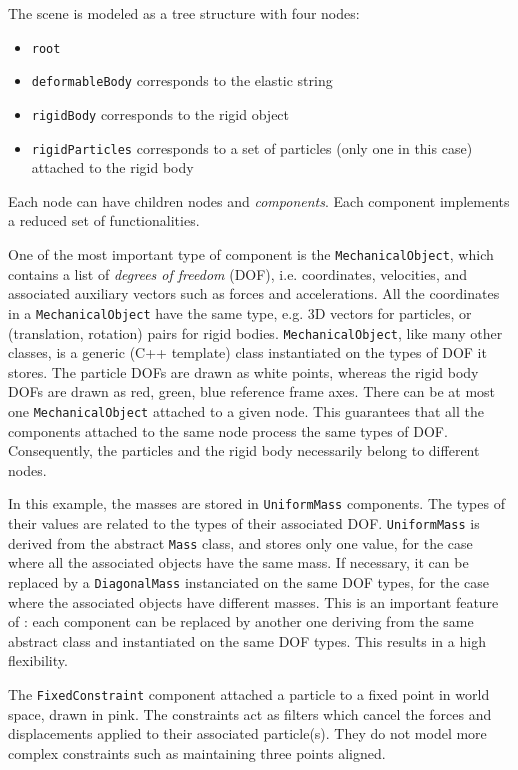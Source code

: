 The scene is modeled as a tree structure with four nodes:
\begin{itemize}
 \item \texttt{root}
 \item \texttt{deformableBody} corresponds to the elastic string
 \item \texttt{rigidBody} corresponds to the rigid object
 \item \texttt{rigidParticles} corresponds to a set of particles (only one in this case) attached to the rigid body
\end{itemize}
Each node can have children nodes and \textit{components}. 
Each component implements a reduced set of functionalities.


One of the most important type of component is the \texttt{MechanicalObject}, which contains a list of \textit{degrees of freedom} (DOF), i.e. coordinates, velocities, and associated auxiliary vectors such as forces and accelerations.
All the coordinates in a \texttt{MechanicalObject} have the same type, e.g. 3D vectors for particles, or (translation, rotation) pairs for rigid bodies. 
\texttt{MechanicalObject}, like many other \sofa classes, is a generic (C++ template) class instantiated on the types of DOF it stores.
The particle DOFs are drawn as white points, whereas the rigid body DOFs are drawn as red, green, blue reference frame axes.
There can be at most one \texttt{MechanicalObject} attached to a given node. 
This guarantees that all the components attached to the same node process the same types of DOF. 
Consequently, the particles and the rigid body necessarily belong to different nodes.

In this example, the masses are stored in \texttt{UniformMass} components.
The types of their values are related to the types of their associated DOF.
\texttt{UniformMass} is derived from the abstract \texttt{Mass} class, and stores only one value, for the case where all the associated objects have the same mass. 
If necessary, it can be replaced by a \texttt{DiagonalMass} instanciated on the same DOF types, for the case where the associated objects have different masses. 
This is an important feature of \sofa: each component can be replaced by another one deriving from the same abstract class and instantiated on the same DOF types. 
This results in a high flexibility.

The \texttt{FixedConstraint} component attached a particle to a fixed point in world space, drawn in pink. 
The constraints act as filters which cancel the forces and displacements applied to their associated particle(s). 
They do not model more complex constraints such as maintaining three points aligned.

